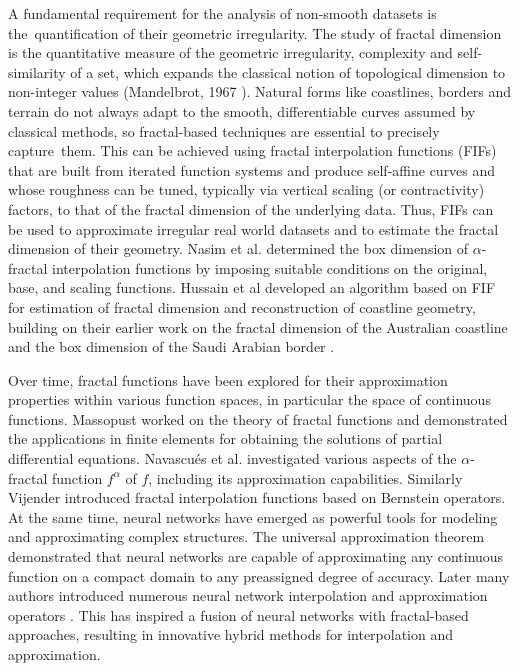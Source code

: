\documentclass{article}[12pt, a4]
\begin{document}
A fundamental requirement for the analysis of non-smooth datasets is the quantification of their geometric irregularity. The study of fractal dimension is the quantitative measure of the geometric irregularity, complexity and self-similarity of a set, which expands the classical notion of topological dimension to non-integer values (Mandelbrot, 1967 \cite{doi:10.1126/science.156.3775.636}). Natural forms like coastlines, borders and terrain do not always adapt to the smooth, differentiable curves assumed by classical methods, so fractal-based techniques are essential to precisely capture them. This can be achieved using fractal interpolation functions (FIFs) that are built from iterated function systems and produce self-affine curves and whose roughness can be tuned, typically via vertical scaling (or contractivity) factors, to that of the fractal dimension of the underlying data. Thus, FIFs can be used to approximate irregular real world datasets and to estimate the fractal dimension of their geometry. Nasim et al. \cite{nasim} determined the box dimension of $\alpha$-fractal interpolation functions by imposing suitable conditions on the original, base, and scaling functions. Hussain et al \cite{husain2024novel} developed an algorithm based on FIF for estimation of fractal dimension and reconstruction of coastline geometry, building on their earlier work on the fractal dimension of the Australian coastline \cite{husain2021fractal} and the box dimension of the Saudi Arabian border \cite{sajid2023box}.

Over time, fractal functions have been explored for their approximation properties within various function spaces, in particular the space of continuous functions. Massopust \cite{MASSOPUST1997171} worked on the theory of fractal functions and demonstrated the applications in finite elements for obtaining the solutions of partial differential equations.
Navascués et al. \cite{Navascues2005, navascues2010fractal, navascues2006smooth} investigated various aspects of the $\alpha$-fractal function $f^{\alpha}$ of $f$, including its approximation capabilities. Similarly Vijender \cite{vijenderbernstein} introduced fractal interpolation functions based on Bernstein operators.
At the same time, neural networks have emerged as powerful tools for modeling and approximating complex structures. The universal approximation theorem \cite{HORNIK1989359} demonstrated that neural networks are capable of approximating any continuous function on a compact domain to any preassigned degree of accuracy. Later many authors introduced numerous neural network interpolation and approximation operators  \cite{BHAT2026190, bhat2026blending, Brewal2026, COSTARELLI201528,  COSTARELLI201480}. This has inspired a fusion of neural networks with fractal-based approaches, resulting in innovative hybrid methods for interpolation and approximation.
\end{document}
